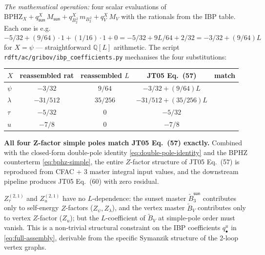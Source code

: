 \documentclass[11pt,a4paper]{article}
\theoremstyle{definition}
\theoremstyle{plain}
\begin{document}
\begin{codebox}[Verification]
\emph{The mathematical operation:} four scalar evaluations of
$\mathrm{BPHZ}_X + q^X_{\textsf{sun}}\,M_{\textsf{sun}} +
q^X_{B_2^{\,2}}\,m_{B_2^{\,2}} + q^X_V\,M_V$ with the rationals from
the IBP table.  Each one is e.g.\ $-5/32 + (9/64)\cdot 1 + (1/16)\cdot
1 + 0 = -5/32 + 9L/64 + 2/32 = -3/32 + (9/64)L$ for $X = \psi$ ---
straightforward $\mathbb{Q}[L]$ arithmetic.  The script
\texttt{rdft/ac/gribov/ibp\_coefficients.py} mechanises the four
substitutions:
\begin{center}
\begin{tabular}{@{}lcccc@{}}
\toprule
$X$ & reassembled rat & reassembled $L$
    & JT05 Eq.~(57) & match \\
\midrule
$\psi$    & $-3/32$    & $9/64$    & $-3/32 + (9/64) L$    & \checkmark\\
$\lambda$ & $-31/512$  & $35/256$  & $-31/512 + (35/256) L$& \checkmark\\
$\tau$    & $-5/32$    & $0$       & $-5/32$               & \checkmark\\
$u$       & $-7/8$     & $0$       & $-7/8$                & \checkmark\\
\bottomrule
\end{tabular}
\end{center}
\textbf{All four Z-factor simple poles match JT05 Eq.~(57) exactly.}
Combined with the closed-form double-pole identity
\eqref{eq:double-pole-identity} and the BPHZ counterterm
\eqref{eq:bphz-simple}, the entire $Z$-factor structure of JT05
Eq.~(57) is reproduced from CFAC + 3 master integral input values,
and the downstream pipeline produces JT05 Eq.~(60) with zero
residual.
\end{codebox}

\begin{cfacbox}
$Z_\tau^{(2,1)}$ and $Z_u^{(2,1)}$ have no $L$-dependence: the sunset
master $\tilde B_3^{\textsf{sun}}$ contributes only to self-energy
$Z$-factors ($Z_\psi, Z_\lambda$), and the vertex master $\tilde B_V$
contributes only to vertex $Z$-factor ($Z_u$); but the $L$-coefficient
of $\tilde B_V$ at simple-pole order must vanish.  This is a
non-trivial structural constraint on the IBP coefficients
$q^u_\bullet$ in \eqref{eq:full-assembly}, derivable from the
specific Symanzik structure of the 2-loop vertex graphs.
\end{cfacbox}

\end{document}
